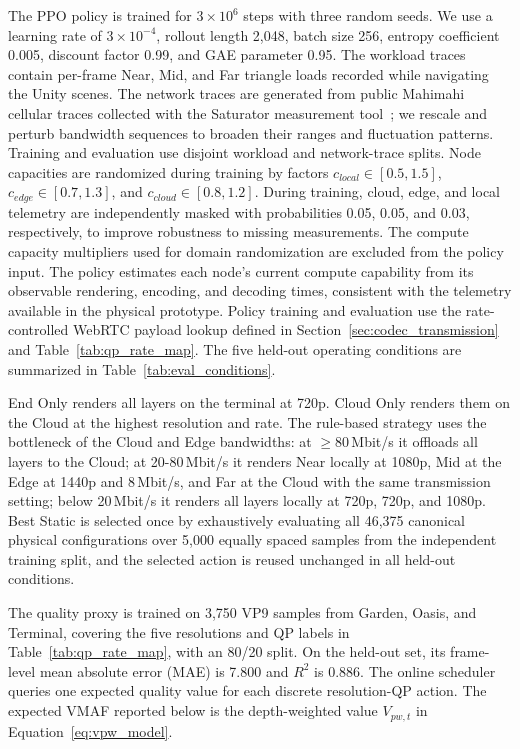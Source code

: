 \documentclass[10pt,journal,compsoc]{IEEEtran}
\begin{document}
The PPO policy is trained for $3\times10^{6}$ steps with three random seeds. We use a learning rate of $3\times10^{-4}$, rollout length 2,048, batch size 256, entropy coefficient 0.005, discount factor 0.99, and GAE parameter 0.95. The workload traces contain per-frame Near, Mid, and Far triangle loads recorded while navigating the Unity scenes. The network traces are generated from public Mahimahi cellular traces collected with the Saturator measurement tool~\cite{winstein_stochastic_2013}; we rescale and perturb bandwidth sequences to broaden their ranges and fluctuation patterns. Training and evaluation use disjoint workload and network-trace splits. Node capacities are randomized during training by factors $c_{local}\in[0.5,1.5]$, $c_{edge}\in[0.7,1.3]$, and $c_{cloud}\in[0.8,1.2]$.
During training, cloud, edge, and local telemetry are independently masked with probabilities 0.05, 0.05, and 0.03, respectively, to improve robustness to missing measurements. The compute capacity multipliers used for domain randomization are excluded from the policy input. The policy estimates each node's current compute capability from its observable rendering, encoding, and decoding times, consistent with the telemetry available in the physical prototype. Policy training and evaluation use the rate-controlled WebRTC payload lookup defined in Section~\ref{sec:codec_transmission} and Table~\ref{tab:qp_rate_map}. The five held-out operating conditions are summarized in Table~\ref{tab:eval_conditions}.

End Only renders all layers on the terminal at 720p. Cloud Only renders them on the Cloud at the highest resolution and rate. The rule-based strategy uses the bottleneck of the Cloud and Edge bandwidths: at $\ge80$\,Mbit/s it offloads all layers to the Cloud; at 20-80\,Mbit/s it renders Near locally at 1080p, Mid at the Edge at 1440p and 8\,Mbit/s, and Far at the Cloud with the same transmission setting; below 20\,Mbit/s it renders all layers locally at 720p, 720p, and 1080p. Best Static is selected once by exhaustively evaluating all 46,375 canonical physical configurations over 5,000 equally spaced samples from the independent training split, and the selected action is reused unchanged in all held-out conditions.

The quality proxy is trained on 3,750 VP9 samples from Garden, Oasis, and Terminal, covering the five resolutions and QP labels in Table~\ref{tab:qp_rate_map}, with an 80/20 split. On the held-out set, its frame-level mean absolute error (MAE) is 7.800 and $R^2$ is 0.886. The online scheduler queries one expected quality value for each discrete resolution-QP action. The expected VMAF reported below is the depth-weighted value $V_{pw,t}$ in Equation~\ref{eq:vpw_model}.
\end{document}
